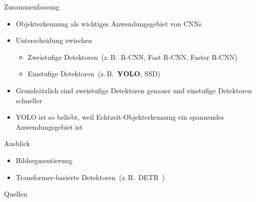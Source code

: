 \documentclass{beamer}
\begin{document}
\begin{frame}{Zusammenfassung}
  \begin{itemize}
    \item<1-> Objekterkennung als wichtiges Anwendungsgebiet von CNNs
    \item<2-> Unterscheidung zwischen
      \begin{itemize}
        \item Zweistufige Detektoren~(z.\,B.~R-CNN, Fast R-CNN, Faster R-CNN)
        \item Einstufige Detektoren~(z.\,B.~\textbf{YOLO}, SSD)
      \end{itemize}
    \item<3-> Grundsätzlich sind zweistufige Detektoren genauer und einstufige Detektoren schneller
    \item<4-> YOLO ist so beliebt, weil Echtzeit-Objekterkennung ein spannendes Anwendungsgebiet ist
  \end{itemize}
\end{frame}

\begin{frame}{Ausblick}
  \begin{itemize}
    \item Bildsegmentierung
    \item Transformer-basierte Detektoren~(z.\,B.~DETR~\cite{Carion2020End})
  \end{itemize}
\end{frame}

\begin{frame}{Quellen}
  \sloppy
  \printbibliography
\end{frame}
\end{document}
